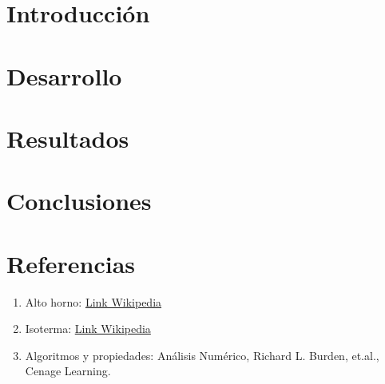 \documentclass[a4paper]{article}
\begin{document}
\thispagestyle{empty}
\vspace{1cm}
\tableofcontents
\newpage

\section{Introducción}
\label{section:introduccion}

\newpage

\section{Desarrollo}
\label{section:desarrollo}

\newpage

\section{Resultados}
\label{section:resultados}

\newpage

\section{Conclusiones}
\label{section:conclusiones}


\section{Referencias} 
\label{section:referencias}
\begin{enumerate}
    \item Alto horno: \href{https://es.wikipedia.org/wiki/Alto_horno}{Link Wikipedia}
    \item Isoterma: \href{https://es.wikipedia.org/wiki/Isoterma}{Link Wikipedia}
    \item Algoritmos y propiedades: Análisis Numérico, Richard L. Burden, et.al., Cenage Learning. 
\end{enumerate}
\end{document}
